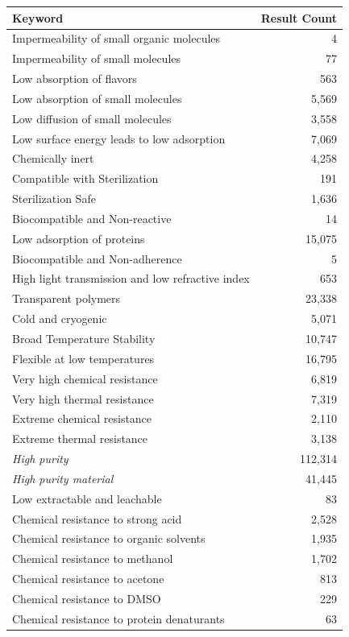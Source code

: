 \begin{table}[h!]
\centering
\begin{tabular}{|l|r|}
\hline
\textbf{Keyword} & \textbf{Result Count} \\
\hline
Impermeability of small organic molecules & 4 \\
Impermeability of small molecules & 77 \\
Low absorption of flavors & 563 \\
Low absorption of small molecules & 5,569 \\
Low diffusion of small molecules & 3,558 \\
Low surface energy leads to low adsorption & 7,069 \\
Chemically inert & 4,258 \\
Compatible with Sterilization & 191 \\
Sterilization Safe & 1,636 \\
Biocompatible and Non-reactive & 14 \\
Low adsorption of proteins & 15,075 \\
Biocompatible and Non-adherence & 5 \\
High light transmission and low refractive index & 653 \\
Transparent polymers & 23,338 \\
Cold and cryogenic & 5,071 \\
Broad Temperature Stability & 10,747 \\
Flexible at low temperatures & 16,795 \\
Very high chemical resistance & 6,819 \\
Very high thermal resistance & 7,319 \\
Extreme chemical resistance & 2,110 \\
Extreme thermal resistance & 3,138 \\
\textit{High purity} & 112,314 \\
\textit{High purity material} & 41,445 \\
Low extractable and leachable & 83 \\
Chemical resistance to strong acid & 2,528 \\
Chemical resistance to organic solvents & 1,935 \\
Chemical resistance to methanol & 1,702 \\
Chemical resistance to acetone & 813 \\
Chemical resistance to DMSO & 229 \\
Chemical resistance to protein denaturants & 63 \\

\end{tabular}
\end{table}
